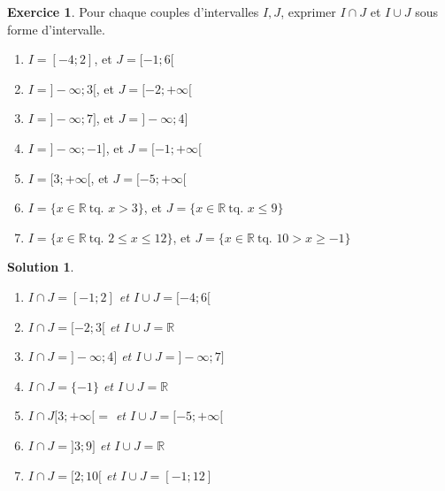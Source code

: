 \documentclass[a4paper, 14pt]{extarticle}
\theoremstyle{plain}
\newtheorem*{sol}{Solution}
\theoremstyle{definition}
\newtheorem{ex}{Exercice}
\newcommand{\R}{\mathbb{R}}
\newcommand{\exe}[2]{
		\begin{ex} #1  \end{ex}
		\begin{sol} #2 \end{sol}
	}
\newcommand{\exe}[2]{
		\begin{ex} #1  \end{ex}
	}
\begin{document}
\exe{
	Pour chaque couples d'intervalles $I,J$, exprimer $I \cap J$ et $I \cup J$ sous forme d'intervalle.
	\begin{enumerate}\itemsep10pt
		\item $I = [-4 ; 2]$, et $J = [-1 ; 6[$
		\item $ I = ] {-}\infty ; 3 [$, et $J =[-2 ; {+}\infty[$ 
		\item $I = ]{-}\infty ; 7]$, et $J =]{-}\infty ; 4]$
		\item $I = ]{-}\infty ; -1]$, et $J = [-1 ; {+}\infty [$
		\item $I = [3 ; {+}\infty [$, et $J = [-5 ; {+}\infty [$
		\item $I = \{ x \in \R \ \text{tq. } x > 3 \}$, et $J = \{ x \in \R \ \text{tq. } x \leq 9 \}$
		\item $I = \{ x \in \R \ \text{tq. } 2 \leq x \leq 12 \}$, et $J = \{ x \in \R \ \text{tq. } 10 > x \geq -1 \}$
	\end{enumerate}
}{

	\begin{enumerate}\itemsep10pt
		\item $I\cap J = [{-}1; 2]$ et $I \cup J = [{-}4; 6[$
		\item $I\cap J = [{-}2; 3[$ et $I \cup J = \R$
		\item $I\cap J = ]{-}\infty; 4]$ et $I \cup J =  ]{-}\infty; 7]$
		\item $I\cap J = \{-1\} $ et $I \cup J = \R$
		\item $I\cap J [3; {+}\infty[= $ et $I \cup J = [{-}5; {+}\infty[$
		\item $I\cap J = ]3;9]$ et $I \cup J = \R$
		\item $I\cap J = [2 ; 10[$ et $I \cup J = [{-}1; 12]$
	\end{enumerate}


}
\end{document}

